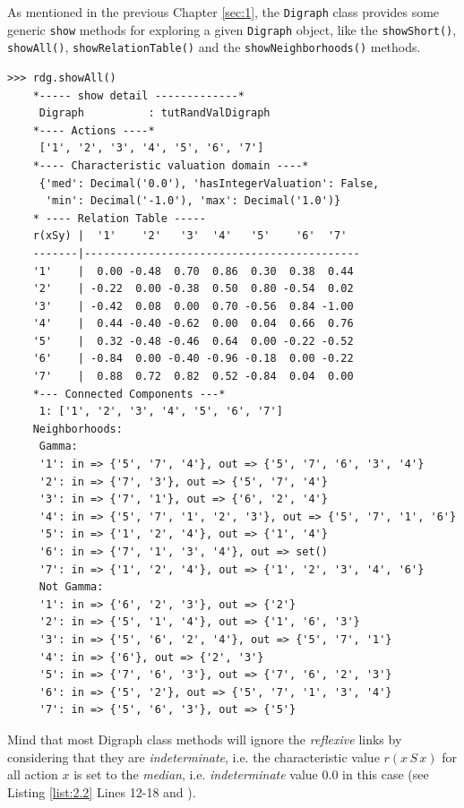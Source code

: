 As mentioned in the previous Chapter \ref{sec:1}, the {\tt Digraph} class provides some generic {\tt show} methods for exploring a given {\tt Digraph} object, like the {\tt showShort()}, {\tt showAll()}, {\tt showRelationTable()} and the {\tt showNeighborhoods()} methods.
\begin{lstlisting}[caption={Example of random valuation digraph},label=list:2.2]
   >>> rdg.showAll()
    *----- show detail -------------*
     Digraph          : tutRandValDigraph
    *---- Actions ----*
     ['1', '2', '3', '4', '5', '6', '7']
    *---- Characteristic valuation domain ----*
     {'med': Decimal('0.0'), 'hasIntegerValuation': False, 
      'min': Decimal('-1.0'), 'max': Decimal('1.0')}
    * ---- Relation Table -----
    r(xSy) |  '1'    '2'   '3'  '4'   '5'    '6'  '7'	  
    -------|-------------------------------------------
    '1'    |  0.00 -0.48  0.70  0.86  0.30  0.38  0.44	 
    '2'    | -0.22  0.00 -0.38  0.50  0.80 -0.54  0.02	 
    '3'    | -0.42  0.08  0.00  0.70 -0.56  0.84 -1.00	 
    '4'    |  0.44 -0.40 -0.62  0.00  0.04  0.66  0.76	 
    '5'    |  0.32 -0.48 -0.46  0.64  0.00 -0.22 -0.52	 
    '6'    | -0.84  0.00 -0.40 -0.96 -0.18  0.00 -0.22	 
    '7'    |  0.88  0.72  0.82  0.52 -0.84  0.04  0.00
    *--- Connected Components ---*
     1: ['1', '2', '3', '4', '5', '6', '7']
    Neighborhoods:
     Gamma:
     '1': in => {'5', '7', '4'}, out => {'5', '7', '6', '3', '4'}
     '2': in => {'7', '3'}, out => {'5', '7', '4'}
     '3': in => {'7', '1'}, out => {'6', '2', '4'}
     '4': in => {'5', '7', '1', '2', '3'}, out => {'5', '7', '1', '6'}
     '5': in => {'1', '2', '4'}, out => {'1', '4'}
     '6': in => {'7', '1', '3', '4'}, out => set()
     '7': in => {'1', '2', '4'}, out => {'1', '2', '3', '4', '6'}
     Not Gamma:
     '1': in => {'6', '2', '3'}, out => {'2'}
     '2': in => {'5', '1', '4'}, out => {'1', '6', '3'}
     '3': in => {'5', '6', '2', '4'}, out => {'5', '7', '1'}
     '4': in => {'6'}, out => {'2', '3'}
     '5': in => {'7', '6', '3'}, out => {'7', '6', '2', '3'}
     '6': in => {'5', '2'}, out => {'5', '7', '1', '3', '4'}
     '7': in => {'5', '6', '3'}, out => {'5'}
\end{lstlisting}   

Mind that most Digraph class methods will ignore the \emph{reflexive} links by considering that they are \emph{indeterminate}, i.e. the characteristic value $r(x\,S\,x)$ for all action $x$ is set to the \emph{median}, i.e. \emph{indeterminate} value $0.0$ in this case (see Listing \ref{list:2.2} Lines 12-18 and \citep{BIS-2004a} ).

